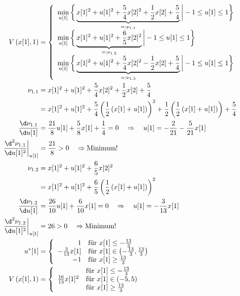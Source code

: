 \begin{exmp}
\begin{enumerate}[label=(S\arabic*)]
\begin{align*}
	V\left(x[1],1\right) & = \left\{\begin{array}{l}
	\min\limits_{u[1]}\bigg\{\underbrace{x[1]^2+u[1]^2+\frac54x[2]^2+\frac12x[2]+\frac54}_{=:\nu_{1.1}} \bigg| -1\leq u[1]\leq 1\bigg\}\\
	\min\limits_{u[1]}\bigg\{\underbrace{x[1]^2+u[1]^2+\frac65x[2]^2}_{=:\nu_{1.2}} \bigg| -1\leq u[1]\leq 1\bigg\}\\
	\min\limits_{u[1]}\bigg\{\underbrace{x[1]^2+u[1]^2+\frac54x[2]^2-\frac12x[2]+\frac54}_{=:\nu_{1.3}} \bigg| -1\leq u[1]\leq 1\bigg\}
	\end{array}\right.\\
	\nu_{1.1} & = x[1]^2+u[1]^2+\frac54x[2]^2+\frac12x[2]+\frac54\\
	& = x[1]^2+u[1]^2+\frac54\left(\frac12\left(x[1]+u[1] \right) \right)^2+\frac12\left(\frac12\left(x[1]+u[1] \right) \right) +\frac54\\
	\frac{\d \nu_{1.1}}{\d u[1]} & = \frac{21}{8}u[1] + \frac58x[1] + \frac14 =0\quad \Rightarrow \quad u[1]=-\frac{2}{21}-\frac{5}{21}x[1]\\
	\left.\frac{\d^2 \nu_{1.1}}{\d u[1]^2}\right|_{u[1]} & = \frac{21}{8} > 0\quad\Rightarrow\text{Minimum!}\\
	\nu_{1.2} & = x[1]^2+u[1]^2+\frac65x[2]^2\\
	& = x[1]^2+u[1]^2+\frac65\left(\frac12\left(x[1]+u[1] \right) \right)^2\\
	\frac{\d \nu_{1.2}}{\d u[1]} & = \frac{26}{10}u[1]+\frac{6}{10}x[1] =0\quad \Rightarrow \quad u[1]=-\frac{3}{13}x[1]\\
	\left.\frac{\d^2 \nu_{1.2}}{\d u[1]^2}\right|_{u[1]} & = 26 > 0\quad\Rightarrow\text{Minimum!}\\
	u^{\ast}[1] & = \left\{\begin{array}{rl}
	1 & \text{für } x[1]\leq -\frac{13}{3}\\
	-\frac{3}{13}x[1] & \text{für } x[1]\in\left(-\frac{13}{3},\frac{13}{3}\right)\\
	-1 & \text{für } x[1]\geq \frac{13}{3}	
	\end{array}
	\right.\\
	V\left(x[1],1\right) & = \left\{\begin{array}{rl}
	 & \text{für } x[1]\leq -\frac{13}{3}\\
	\frac{16}{13}x[1]^2 & \text{für } x[1]\in(-5,5)\\
	 & \text{für }x[1]\geq \frac{13}{3}
	\end{array}
	\right.\\
\end{align*}

\end{enumerate}
\end{exmp}
